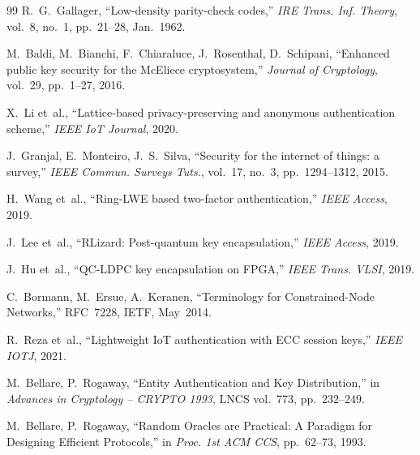 \documentclass[conference]{IEEEtran}
\begin{document}
\begin{thebibliography}{99}
R.~G.~Gallager,
``Low-density parity-check codes,''
\textit{IRE Trans. Inf. Theory}, vol.~8, no.~1, pp.~21--28, Jan.~1962.

M.~Baldi, M.~Bianchi, F.~Chiaraluce, J.~Rosenthal, D.~Schipani,
``Enhanced public key security for the {McEliece} cryptosystem,''
\textit{Journal of Cryptology}, vol.~29, pp.~1--27, 2016.

X.~Li et~al.,
``Lattice-based privacy-preserving and anonymous authentication scheme,''
\textit{IEEE IoT Journal}, 2020.

J.~Granjal, E.~Monteiro, J.~S.~Silva,
``Security for the internet of things: a survey,''
\textit{IEEE Commun. Surveys Tuts.}, vol.~17, no.~3,
pp.~1294--1312, 2015.

H.~Wang et~al.,
``Ring-{LWE} based two-factor authentication,''
\textit{IEEE Access}, 2019.

J.~Lee et~al.,
``{RLizard}: Post-quantum key encapsulation,''
\textit{IEEE Access}, 2019.

J.~Hu et~al.,
``{QC-LDPC} key encapsulation on {FPGA},''
\textit{IEEE Trans. VLSI}, 2019.

C.~Bormann, M.~Ersue, A.~Keranen,
``Terminology for Constrained-Node Networks,''
RFC~7228, IETF, May~2014.

R.~Reza et~al.,
``Lightweight {IoT} authentication with {ECC} session keys,''
\textit{IEEE IOTJ}, 2021.

M.~Bellare, P.~Rogaway,
``Entity Authentication and Key Distribution,''
in \textit{Advances in Cryptology -- CRYPTO 1993}, LNCS vol.~773,
pp.~232--249.

M.~Bellare, P.~Rogaway,
``Random Oracles are Practical: A Paradigm for Designing Efficient
Protocols,''
in \textit{Proc. 1st ACM CCS}, pp.~62--73, 1993.

\end{thebibliography}
\end{document}
